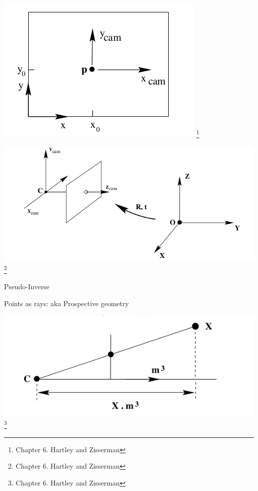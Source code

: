 \documentclass{beamer}
\begin{document}
  \begin{frame}
    \includegraphics[width=0.4\linewidth]{media/image-center.png}
    \footnote{Chapter 6. Hartley and Zisserman}
  \end{frame}

  \begin{frame}
    \includegraphics[width=0.4\linewidth]{media/world-camera-transformation.png}
    \footnote{Chapter 6. Hartley and Zisserman}
  \end{frame}

  \begin{frame}{Pseudo-Inverse}

  \end{frame}

  \begin{frame}{Points as rays: aka Prospective geometry}
  \end{frame}

  \begin{frame}
    \includegraphics[width=0.4\linewidth]{media/recovering-ray-from-point.png}
    \footnote{Chapter 6. Hartley and Zisserman}
  \end{frame}
\end{document}
